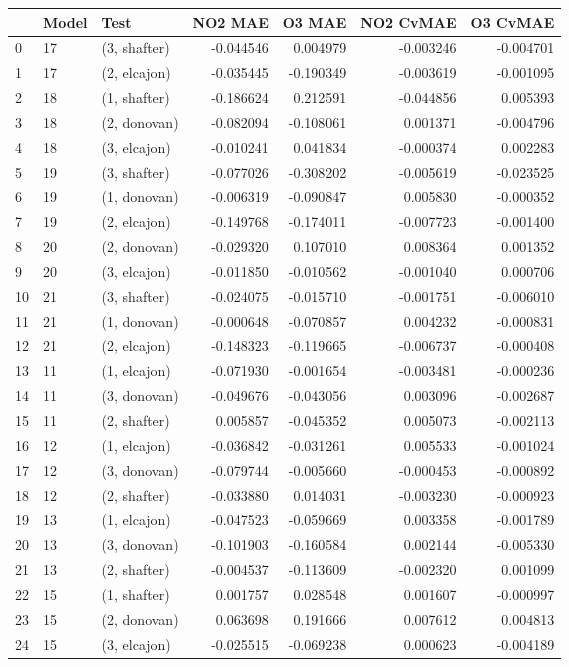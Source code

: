 \begin{tabular}{lllrrrr}
\toprule
{} & Model &          Test &   NO2 MAE &    O3 MAE &  NO2 CvMAE &  O3 CvMAE \\
\midrule
0  &    17 &  (3, shafter) & -0.044546 &  0.004979 &  -0.003246 & -0.004701 \\
1  &    17 &  (2, elcajon) & -0.035445 & -0.190349 &  -0.003619 & -0.001095 \\
2  &    18 &  (1, shafter) & -0.186624 &  0.212591 &  -0.044856 &  0.005393 \\
3  &    18 &  (2, donovan) & -0.082094 & -0.108061 &   0.001371 & -0.004796 \\
4  &    18 &  (3, elcajon) & -0.010241 &  0.041834 &  -0.000374 &  0.002283 \\
5  &    19 &  (3, shafter) & -0.077026 & -0.308202 &  -0.005619 & -0.023525 \\
6  &    19 &  (1, donovan) & -0.006319 & -0.090847 &   0.005830 & -0.000352 \\
7  &    19 &  (2, elcajon) & -0.149768 & -0.174011 &  -0.007723 & -0.001400 \\
8  &    20 &  (2, donovan) & -0.029320 &  0.107010 &   0.008364 &  0.001352 \\
9  &    20 &  (3, elcajon) & -0.011850 & -0.010562 &  -0.001040 &  0.000706 \\
10 &    21 &  (3, shafter) & -0.024075 & -0.015710 &  -0.001751 & -0.006010 \\
11 &    21 &  (1, donovan) & -0.000648 & -0.070857 &   0.004232 & -0.000831 \\
12 &    21 &  (2, elcajon) & -0.148323 & -0.119665 &  -0.006737 & -0.000408 \\
13 &    11 &  (1, elcajon) & -0.071930 & -0.001654 &  -0.003481 & -0.000236 \\
14 &    11 &  (3, donovan) & -0.049676 & -0.043056 &   0.003096 & -0.002687 \\
15 &    11 &  (2, shafter) &  0.005857 & -0.045352 &   0.005073 & -0.002113 \\
16 &    12 &  (1, elcajon) & -0.036842 & -0.031261 &   0.005533 & -0.001024 \\
17 &    12 &  (3, donovan) & -0.079744 & -0.005660 &  -0.000453 & -0.000892 \\
18 &    12 &  (2, shafter) & -0.033880 &  0.014031 &  -0.003230 & -0.000923 \\
19 &    13 &  (1, elcajon) & -0.047523 & -0.059669 &   0.003358 & -0.001789 \\
20 &    13 &  (3, donovan) & -0.101903 & -0.160584 &   0.002144 & -0.005330 \\
21 &    13 &  (2, shafter) & -0.004537 & -0.113609 &  -0.002320 &  0.001099 \\
22 &    15 &  (1, shafter) &  0.001757 &  0.028548 &   0.001607 & -0.000997 \\
23 &    15 &  (2, donovan) &  0.063698 &  0.191666 &   0.007612 &  0.004813 \\
24 &    15 &  (3, elcajon) & -0.025515 & -0.069238 &   0.000623 & -0.004189 \\
\bottomrule
\end{tabular}
